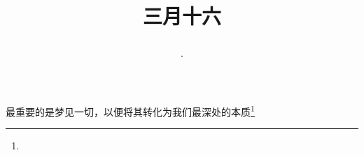 \title{\date[d=24,m=4,y=2024][year:cn-y,年,month:cn,day:cn,日,·,weekday]·三月十六 }
最重要的是梦见一切，以便将其转化为我们最深处的本质\footnote{ }

